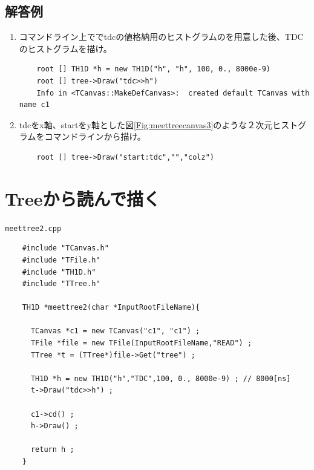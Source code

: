   \subsection{解答例}
  \begin{enumerate}
   \item コマンドライン上ででtdcの値格納用のヒストグラムのを用意した後、TDCのヒストグラムを描け。
\begin{verbatim}
	root [] TH1D *h = new TH1D("h", "h", 100, 0., 8000e-9)
	root [] tree->Draw("tdc>>h")
	Info in <TCanvas::MakeDefCanvas>:  created default TCanvas with name c1
\end{verbatim}
   \item tdcをx軸、startをy軸とした図\ref{Fig:meettreecanvas3}のような２次元ヒストグラムをコマンドラインから描け。
\begin{verbatim}
	root [] tree->Draw("start:tdc","","colz")
\end{verbatim}
  \end{enumerate}


 \section{Treeから読んで描く}

 \begin{itembox}{\texttt{meettree2.cpp}}
\begin{verbatim}
	#include "TCanvas.h"
	#include "TFile.h"
	#include "TH1D.h"
	#include "TTree.h"

	TH1D *meettree2(char *InputRootFileName){

	  TCanvas *c1 = new TCanvas("c1", "c1") ;
	  TFile *file = new TFile(InputRootFileName,"READ") ;
	  TTree *t = (TTree*)file->Get("tree") ;

	  TH1D *h = new TH1D("h","TDC",100, 0., 8000e-9) ; // 8000[ns]
	  t->Draw("tdc>>h") ;

	  c1->cd() ;
	  h->Draw() ;

	  return h ;
	}
\end{verbatim}
 \end{itembox}


